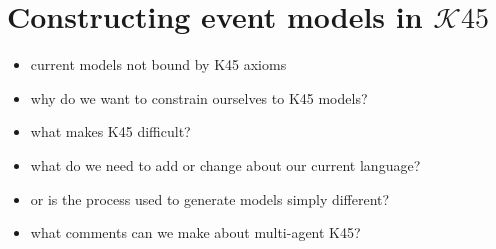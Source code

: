 \section{Constructing event models in $\mathcal{K45}$}


\begin{itemize}
	\item current models not bound by K45 axioms
	\item why do we want to constrain ourselves to K45 models?
	\item what makes K45 difficult?
	\item what do we need to add or change about our current language?
	\item or is the process used to generate models simply different?
	\item what comments can we make about multi-agent K45?
\end{itemize}
